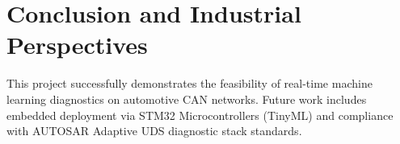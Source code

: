 \documentclass[12pt,a4paper]{report}
\begin{document}
\chapter{Conclusion and Industrial Perspectives}
This project successfully demonstrates the feasibility of real-time machine learning diagnostics on automotive CAN networks. Future work includes embedded deployment via STM32 Microcontrollers (TinyML) and compliance with AUTOSAR Adaptive UDS diagnostic stack standards.
\end{document}
